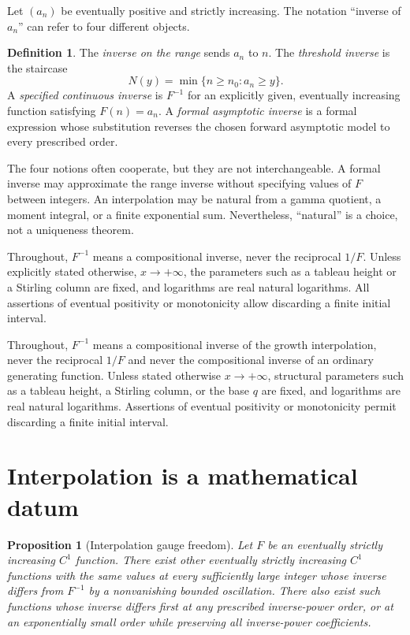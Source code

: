 \documentclass[11pt,openany]{book}
\numberwithin{equation}{chapter}
\theoremstyle{plain}
\newtheorem{proposition}[theorem]{Proposition}
\theoremstyle{definition}
\newtheorem{definition}[theorem]{Definition}
\theoremstyle{remark}
\begin{document}
Let $(a_n)$ be eventually positive and strictly increasing. The notation ``inverse of $a_n$'' can refer to four different objects.

\begin{definition}
The \emph{inverse on the range} sends $a_n$ to $n$. The \emph{threshold inverse} is the staircase
\begin{equation}
 N(y)=\min\{n\ge n_0:a_n\ge y\}.
 \label{t2:eq:staircase}
\end{equation}
A \emph{specified continuous inverse} is $F^{-1}$ for an explicitly given, eventually increasing function satisfying $F(n)=a_n$. A \emph{formal asymptotic inverse} is a formal expression whose substitution reverses the chosen forward asymptotic model to every prescribed order.
\end{definition}

The four notions often cooperate, but they are not interchangeable. A formal inverse may approximate the range inverse without specifying values of $F$ between integers. An interpolation may be natural from a gamma quotient, a moment integral, or a finite exponential sum. Nevertheless, ``natural'' is a choice, not a uniqueness theorem.

Throughout, $F^{-1}$ means a compositional inverse, never the reciprocal $1/F$. Unless explicitly stated otherwise, $x\to+\infty$, the parameters such as a tableau height or a Stirling column are fixed, and logarithms are real natural logarithms. All assertions of eventual positivity or monotonicity allow discarding a finite initial interval.

Throughout, $F^{-1}$ means a compositional inverse of the growth
interpolation, never the reciprocal $1/F$ and never the compositional
inverse of an ordinary generating function.  Unless stated otherwise
$x\to+\infty$, structural parameters such as a tableau height, a Stirling
column, or the base $q$ are fixed, and logarithms are real natural
logarithms.  Assertions of eventual positivity or monotonicity permit
discarding a finite initial interval.

\section{Interpolation is a mathematical datum}

\label{t2:subsec:gauge}

\begin{proposition}[Interpolation gauge freedom]
\label{t2:prop:gauge}
Let $F$ be an eventually strictly increasing $C^1$ function. There exist other eventually strictly increasing $C^1$ functions with the same values at every sufficiently large integer whose inverse differs from $F^{-1}$ by a nonvanishing bounded oscillation. There also exist such functions whose inverse differs first at any prescribed inverse-power order, or at an exponentially small order while preserving all inverse-power coefficients.
\end{proposition}
\end{document}
